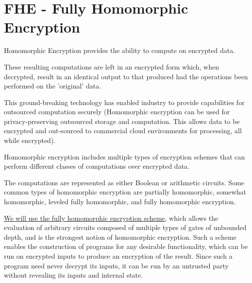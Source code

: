 \documentclass[11pt]{article}
\begin{document}
\section{FHE - Fully Homomorphic Encryption}
Homomorphic Encryption provides the ability to compute on encrypted data.
\par
These resulting computations are left in an encrypted form which, when decrypted, result in an identical output to that produced had the operations been performed on the 'original' data.
\par
This ground-breaking technology has enabled industry to provide capabilities for outsourced computation securely (Homomorphic encryption can be used for privacy-preserving outsourced storage and computation. This allows data to be encrypted and out-sourced to commercial cloud environments for processing, {all while encrypted}).
\par
Homomorphic encryption includes multiple types of encryption schemes that can perform different classes of computations over encrypted data.
\par
The computations are represented as either Boolean or arithmetic circuits. Some common types of homomorphic encryption are partially homomorphic, somewhat homomorphic, leveled fully homomorphic, and fully homomorphic encryption.
\par
\underline{We will use the fully homomorphic encryption scheme}, which allows the evaluation of arbitrary circuits composed of multiple types of gates of unbounded depth, and is the strongest notion of homomorphic encryption. Such a scheme enables the construction of programs for any desirable functionality, which can be run on encrypted inputs to produce an encryption of the result. Since such a program need never decrypt its inputs, it can be run by an untrusted party without revealing its inputs and internal state.
\end{document}
